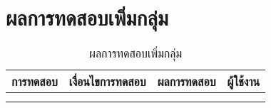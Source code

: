 \section{ผลการทดสอบเพิ่มกลุ่ม}
\begin{table}[H]
	\caption{ผลการทดสอบเพิ่มกลุ่ม}
    \centering	
	\label{tab:test26}
    \begin{tabular}{ | p{4cm} | p{4cm} | p{4cm} | p{2cm} | }
		\hline
	\multicolumn{1}{|c|}{การทดสอบ} & \multicolumn{1}{c|}{เงื่อนไขการทดสอบ} & \multicolumn{1}{c|}{ผลการทดสอบ} & \multicolumn{1}{c|}{ผู้ใช้งาน}                             \\ \hline
	\setstretch{1.0}{ทดสอบเพิ่มกลุ่ม}
	& \setstretch{1.0}{ผู้ใช้เปลี่ยนรูปกลุ่ม และเปลี่ยนชื่อกลุ่ม และกดสร้างกลุ่ม}
	& \setstretch{1.0}{ระบบจะบันทึกรูปภาพและชื่อกลุ่ม} 
	&\setstretch{1.0}{\begin{flushleft}ผู้ใช้งาน\end{flushleft}} \\ \cline{2-3} 
	& \setstretch{1.0}{ผู้ใช้ไม่เปลี่ยนรูปกลุ่ม และไม่เปลี่ยนชื่อกลุ่ม และกดสร้างกลุ่ม}
	& \setstretch{1.0}{ระบบจะบันทึกรูปภาพของระบบ และชื่อกลุ่มของระบบ } 
	&\setstretch{1.0}{}\\ \cline{2-3} \hline
    \end{tabular}
\end{table}

